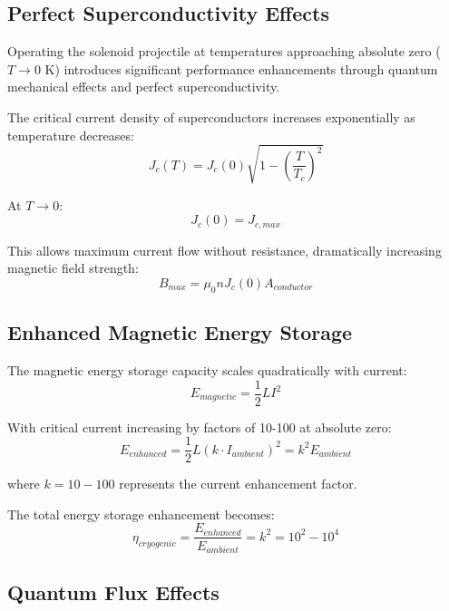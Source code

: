 \documentclass[12pt,a4paper]{article}
\begin{document}
\subsection{Perfect Superconductivity Effects}

Operating the solenoid projectile at temperatures approaching absolute zero ($T \rightarrow 0$ K) introduces significant performance enhancements through quantum mechanical effects and perfect superconductivity.

The critical current density of superconductors increases exponentially as temperature decreases:
\begin{equation}
J_c(T) = J_c(0) \sqrt{1 - \left(\frac{T}{T_c}\right)^2}
\end{equation}

At $T \rightarrow 0$:
\begin{equation}
J_c(0) = J_{c,max}
\end{equation}

This allows maximum current flow without resistance, dramatically increasing magnetic field strength:
\begin{equation}
B_{max} = \mu_0 n J_c(0) A_{conductor}
\end{equation}

\subsection{Enhanced Magnetic Energy Storage}

The magnetic energy storage capacity scales quadratically with current:
\begin{equation}
E_{magnetic} = \frac{1}{2}LI^2
\end{equation}

With critical current increasing by factors of 10-100 at absolute zero:
\begin{equation}
E_{enhanced} = \frac{1}{2}L(k \cdot I_{ambient})^2 = k^2 E_{ambient}
\end{equation}

where $k = 10-100$ represents the current enhancement factor.

The total energy storage enhancement becomes:
\begin{equation}
\eta_{cryogenic} = \frac{E_{enhanced}}{E_{ambient}} = k^2 = 10^2 - 10^4
\end{equation}

\subsection{Quantum Flux Effects}
\end{document}
